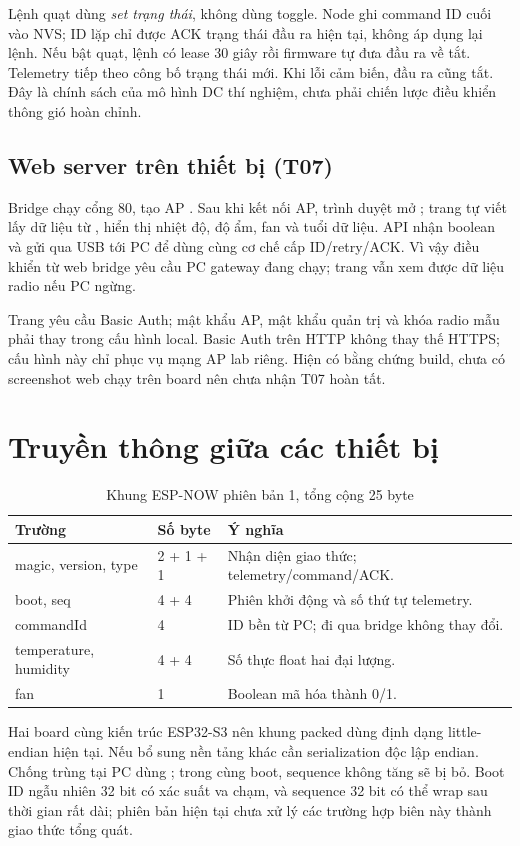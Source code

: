 Lệnh quạt dùng \emph{set trạng thái}, không dùng toggle. Node ghi command ID cuối vào NVS; ID lặp chỉ được ACK trạng thái đầu ra hiện tại, không áp dụng lại lệnh. Nếu bật quạt, lệnh có lease 30 giây rồi firmware tự đưa đầu ra về tắt. Telemetry tiếp theo công bố trạng thái mới. Khi lỗi cảm biến, đầu ra cũng tắt. Đây là chính sách của mô hình DC thí nghiệm, chưa phải chiến lược điều khiển thông gió hoàn chỉnh.

\subsection{Web server trên thiết bị (T07)}
Bridge chạy  cổng 80, tạo AP . Sau khi kết nối AP, trình duyệt mở ; trang tự viết lấy dữ liệu từ , hiển thị nhiệt độ, độ ẩm, fan và tuổi dữ liệu. API  nhận boolean và gửi  qua USB tới PC để dùng cùng cơ chế cấp ID/retry/ACK. Vì vậy điều khiển từ web bridge yêu cầu PC gateway đang chạy; trang vẫn xem được dữ liệu radio nếu PC ngừng.

Trang yêu cầu Basic Auth; mật khẩu AP, mật khẩu quản trị và khóa radio mẫu phải thay trong cấu hình local. Basic Auth trên HTTP không thay thế HTTPS; cấu hình này chỉ phục vụ mạng AP lab riêng. Hiện có bằng chứng build, chưa có screenshot web chạy trên board nên chưa nhận T07 hoàn tất.

\section{Truyền thông giữa các thiết bị}
\begin{table}[H]\centering\small
\caption{Khung ESP-NOW phiên bản 1, tổng cộng 25 byte}
\begin{tabular}{P{4cm}P{2.3cm}P{8cm}}
\toprule Trường & Số byte & Ý nghĩa \\ \midrule
magic, version, type & 2 + 1 + 1 & Nhận diện giao thức; telemetry/command/ACK. \\
boot, seq & 4 + 4 & Phiên khởi động và số thứ tự telemetry. \\
commandId & 4 & ID bền từ PC; đi qua bridge không thay đổi. \\
temperature, humidity & 4 + 4 & Số thực float hai đại lượng. \\
fan & 1 & Boolean mã hóa thành 0/1. \\
\bottomrule
\end{tabular}
\end{table}
Hai board cùng kiến trúc ESP32-S3 nên khung packed dùng định dạng little-endian hiện tại. Nếu bổ sung nền tảng khác cần serialization độc lập endian. Chống trùng tại PC dùng ; trong cùng boot, sequence không tăng sẽ bị bỏ. Boot ID ngẫu nhiên 32 bit có xác suất va chạm, và sequence 32 bit có thể wrap sau thời gian rất dài; phiên bản hiện tại chưa xử lý các trường hợp biên này thành giao thức tổng quát.

